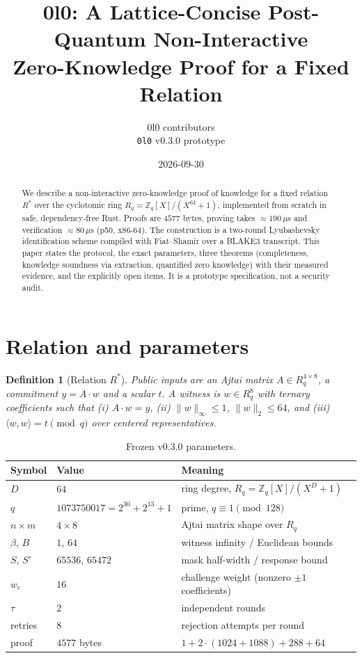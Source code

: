 \documentclass[11pt,a4paper]{article}
\title{0l0: A Lattice-Concise Post-Quantum Non-Interactive\\ Zero-Knowledge Proof for a Fixed Relation}
\author{0l0 contributors\\ \texttt{0l0} v0.3.0 prototype}
\date{2026-09-30}
\newtheorem{definition}{Definition}[section]
\theoremstyle{remark}
\begin{document}
\maketitle

\begin{abstract}
We describe a non-interactive zero-knowledge proof of knowledge for a fixed
relation $R^*$ over the cyclotomic ring $R_q = \mathbb{Z}_q[X]/(X^{64}+1)$,
implemented from scratch in safe, dependency-free Rust. Proofs are
$4577$ bytes, proving takes $\approx 190\,\mu\mathrm{s}$ and verification
$\approx 80\,\mu\mathrm{s}$ (p50, x86-64). The construction is a two-round
Lyubashevsky identification scheme compiled with Fiat--Shamir over a BLAKE3
transcript. This paper states the protocol, the exact parameters, three
theorems (completeness, knowledge soundness via extraction, quantified
zero knowledge) with their measured evidence, and the explicitly open
items. It is a prototype specification, not a security audit.
\end{abstract}

\tableofcontents
\newpage

\section{Relation and parameters}

\begin{definition}[Relation $R^*$]
Public inputs are an Ajtai matrix $A \in R_q^{4\times 8}$, a commitment
$y = A\cdot w$ and a scalar $t$. A witness is $w \in R_q^8$ with ternary
coefficients such that {\rm (i)} $A\cdot w = y$, {\rm (ii)}
$\lVert w\rVert_\infty \le 1$, $\lVert w\rVert_2 \le 64$, and
{\rm (iii)} $\langle w,w\rangle = t \pmod q$ over centered representatives.
\end{definition}

\begin{table}[h]
\centering
\begin{tabular}{lll}
\toprule
Symbol & Value & Meaning \\
\midrule
$D$ & $64$ & ring degree, $R_q = \mathbb{Z}_q[X]/(X^D+1)$ \\
$q$ & $1073750017 = 2^{30}+2^{13}+1$ & prime, $q \equiv 1 \pmod{128}$ \\
$n \times m$ & $4 \times 8$ & Ajtai matrix shape over $R_q$ \\
$\beta$, $B$ & $1$, $64$ & witness infinity / Euclidean bounds \\
$S$, $S'$ & $65536$, $65472$ & mask half-width / response bound \\
$w_c$ & $16$ & challenge weight (nonzero $\pm 1$ coefficients) \\
$\tau$ & $2$ & independent rounds \\
retries & $8$ & rejection attempts per round \\
proof & $4577$ bytes & $1 + 2\cdot(1024+1088) + 288 + 64$ \\
\bottomrule
\end{tabular}
\caption{Frozen v0.3.0 parameters.}
\end{table}
\end{document}
